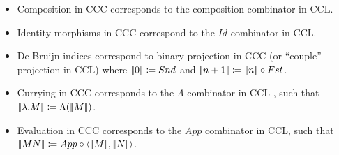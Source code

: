 \documentclass{article}
\newcommand{\ccc}{\(\text{CCC}\)} %
\newcommand{\ccl}{\(\text{CCL}\)} %
\newcommand{\la}{\langle}
\newcommand{\ra}{\rangle}
\begin{document}
\begin{itemize}
  \item Composition in \ccc{} corresponds to the composition combinator in \ccl.
  \item Identity morphisms in \ccc{} correspond to the \(Id\) combinator in \ccl.
  \item De Bruijn indices correspond to binary projection in \ccc{} (or ``couple'' projection in \ccl) where \(\cc{0} \coloneq Snd\) and \(\cc{n + 1} \coloneq \cc{n} \circ Fst\).
  \item Currying in \ccc{} corresponds to the \(\Lambda\) combinator in \ccl{} \autocite[p. 176][line 5]{cmachine}, such that \(\cc{\lambda . M} \coloneq \Lambda(\cc{M})\).
  \item Evaluation in \ccc{} corresponds to the \(App\) combinator in \ccl, such that \(\cc{M N} \coloneq \comp{App}{\pair{\cc{M}, \cc{N}}}\).
\end{itemize}



\end{document}
